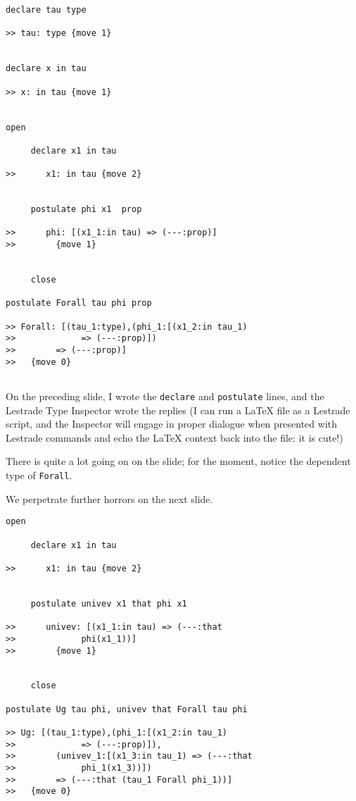 \documentclass[12pt]{slides}
\begin{document}
\begin{slide}
{\tiny
\begin{verbatim}
declare tau type

>> tau: type {move 1}


declare x in tau

>> x: in tau {move 1}


open

     declare x1 in tau

>>      x1: in tau {move 2}


     postulate phi x1  prop

>>      phi: [(x1_1:in tau) => (---:prop)]
>>        {move 1}


     close

postulate Forall tau phi prop

>> Forall: [(tau_1:type),(phi_1:[(x1_2:in tau_1) 
>>             => (---:prop)])
>>        => (---:prop)]
>>   {move 0}


\end{verbatim}
}

\end{slide}

\begin{slide}

On the preceding slide, I wrote the {\tt declare} and {\tt postulate} lines, and the Lestrade Type Inspector wrote the replies (I can run a LaTeX file as a Lestrade script, and the Inspector will engage in proper dialogue when presented with Lestrade commands and echo the LaTeX context back into the file:  it is cute!)

There is quite a lot going on on the slide;  for the moment, notice the dependent type of {\tt Forall}.

We perpetrate further horrors on the next slide.

\end{slide}

\begin{slide}

{\tiny
\begin{verbatim}
open

     declare x1 in tau

>>      x1: in tau {move 2}


     postulate univev x1 that phi x1

>>      univev: [(x1_1:in tau) => (---:that 
>>             phi(x1_1))]
>>        {move 1}


     close

postulate Ug tau phi, univev that Forall tau phi

>> Ug: [(tau_1:type),(phi_1:[(x1_2:in tau_1) 
>>             => (---:prop)]),
>>        (univev_1:[(x1_3:in tau_1) => (---:that 
>>             phi_1(x1_3))])
>>        => (---:that (tau_1 Forall phi_1))]
>>   {move 0}


\end{verbatim}
}


\end{slide}
\end{document}
